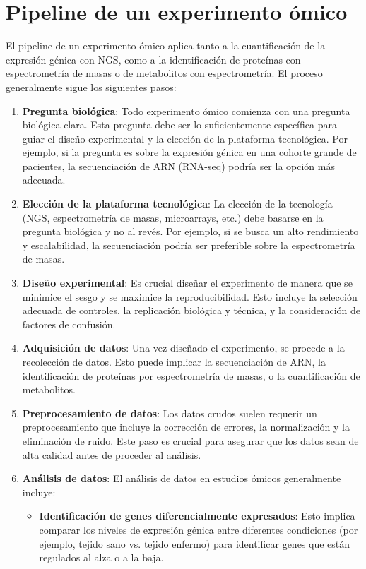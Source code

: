 \section{Pipeline de un experimento ómico}
El pipeline de un experimento ómico aplica tanto a la cuantificación de la expresión génica con NGS, como a la identificación de proteínas con espectrometría de masas o de metabolitos con espectrometría. El proceso generalmente sigue los siguientes pasos:
\begin{enumerate}
\item \textbf{Pregunta biológica}: Todo experimento ómico comienza con una pregunta biológica clara. Esta pregunta debe ser lo suficientemente específica para guiar el diseño experimental y la elección de la plataforma tecnológica. Por ejemplo, si la pregunta es sobre la expresión génica en una cohorte grande de pacientes, la secuenciación de ARN (RNA-seq) podría ser la opción más adecuada.
\item \textbf{Elección de la plataforma tecnológica}: La elección de la tecnología (NGS, espectrometría de masas, microarrays, etc.) debe basarse en la pregunta biológica y no al revés. Por ejemplo, si se busca un alto rendimiento y escalabilidad, la secuenciación podría ser preferible sobre la espectrometría de masas.
\item \textbf{Diseño experimental}: Es crucial diseñar el experimento de manera que se minimice el sesgo y se maximice la reproducibilidad. Esto incluye la selección adecuada de controles, la replicación biológica y técnica, y la consideración de factores de confusión.
\item \textbf{Adquisición de datos}: Una vez diseñado el experimento, se procede a la recolección de datos. Esto puede implicar la secuenciación de ARN, la identificación de proteínas por espectrometría de masas, o la cuantificación de metabolitos.
\item \textbf{Preprocesamiento de datos}: Los datos crudos suelen requerir un preprocesamiento que incluye la corrección de errores, la normalización y la eliminación de ruido. Este paso es crucial para asegurar que los datos sean de alta calidad antes de proceder al análisis.
\item \textbf{Análisis de datos}: El análisis de datos en estudios ómicos generalmente incluye:
\begin{itemize}
\item \textbf{Identificación de genes diferencialmente expresados}: Esto implica comparar los niveles de expresión génica entre diferentes condiciones (por ejemplo, tejido sano vs. tejido enfermo) para identificar genes que están regulados al alza o a la baja.

\end{itemize}
\end{enumerate}
